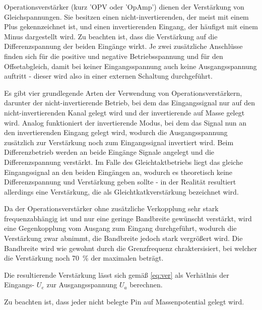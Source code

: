 Operationsverstärker (kurz 'OPV oder 'OpAmp') dienen der Verstärkung von
Gleichspannungen. Sie besitzen einen nicht-invertierenden, der meist mit einem
Plus gekennzeichnet ist, und einen invertierenden Eingang, der häufigst mit
einem Minus dargestellt wird. Zu beachten ist, dass die Verstärkung auf die
Differenzspannung der beiden Eingänge wirkt. Je zwei zusätzliche Anschlüsse
finden sich für die positive und negative Betriebsspannung und für den
Offsetabgleich, damit bei keiner Eingangsspannung auch keine Ausgangsspannung
auftritt - dieser wird also in einer externen Schaltung durchgeführt.


Es gibt vier grundlegende Arten der Verwendung von Operationsverstärkern,
darunter der nicht-invertierende Betrieb, bei dem das Eingangssignal nur auf
den nicht-invertierenden Kanal gelegt wird und der invertierende auf Masse
gelegt wird. Analog funktioniert der invertierende Modus, bei dem das Signal
nun an den invertierenden Eingang gelegt wird, wodurch die Ausgangsspannung
zusätzlich zur Verstärkung noch zum Eingangssignal invertiert wird. Beim
Differenzbetrieb werden an beide Eingänge Signale angelegt und die
Differenzspannung verstärkt. Im Falle des Gleichtaktbetriebs liegt das gleiche
Eingangssignal an den beiden Eingängen an, wodurch es theoretisch keine
Differenzspannung und Verstärkung geben sollte - in der Realität resultiert
allerdings eine Verstärkung, die als Gleichtkatkverstärkung bezeichnet wird.

Da der Operationsverstärker ohne zusätzliche Verkopplung sehr stark
frequenzabhängig ist und nur eine geringe Bandbreite gewünscht verstärkt, wird
eine Gegenkopplung vom Ausgang zum Eingang durchgeführt, wodurch die
Verstärkung zwar abnimmt, die Bandbreite jedoch stark vergrößert wird. Die
Bandbreite wird wie gewohnt durch die Grenzfrequenz chraktersisiert, bei
welcher die Verstärkung noch \SI{70}{\%} der maximalen beträgt.

Die resultierende Verstärkung lässt sich gemäß \autoref{eq:ver} als Verhätlnis
der Eingangs- $U_e$ zur Ausgangsspannung $U_a$ berechnen.


Zu beachten ist, dass jeder nicht belegte Pin auf Massenpotential gelegt wird.
